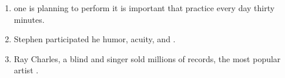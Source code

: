 \begin{spacing}{1.5}
\begin{enumerate}
\vfill
\item \begin{inparaenum}[A]
  one is planning to perform   it is important that  practice every day  thirty minutes. 
\end{inparaenum}

\vfill
\item \begin{inparaenum}[A]
 Stephen participated  he  humor, acuity, and . 
\end{inparaenum}

\vfill
\item \begin{inparaenum}[A]
Ray Charles, a blind  and singer  sold millions of records,  the most popular artist . 
\end{inparaenum}
\end{enumerate}
\end{spacing}

\vfill